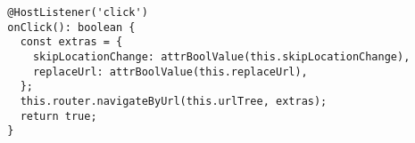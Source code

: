 \begin{verbatim}
  @HostListener('click')
  onClick(): boolean {
    const extras = {
      skipLocationChange: attrBoolValue(this.skipLocationChange),
      replaceUrl: attrBoolValue(this.replaceUrl),
    };
    this.router.navigateByUrl(this.urlTree, extras);
    return true;
  }
\end{verbatim}
